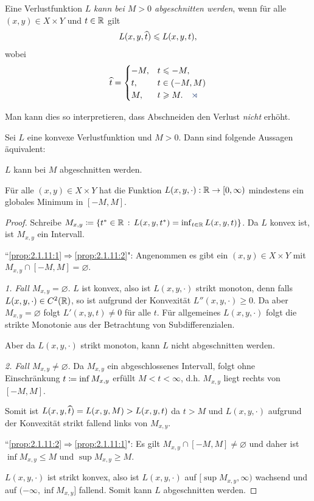 \begin{defn}
\label{defn:2.1.10}
Eine Verlustfunktion $L$ \emph{kann bei $M>0$ abgeschnitten werden},
wenn für alle $(x,y)\in X\times Y$ und $t\in\mathbb{R}$ gilt
\begin{align*}
L(x,y,\cut{t}) \le L(x,y,t),
\end{align*}
wobei 
\begin{align*}
\cut{t} = 
\begin{cases}
-M, & t \le -M,\\
t, & t\in (-M,M)\\
M, & t\ge M.\fishhere
\end{cases}
\end{align*}
\end{defn}
Man kann dies so interpretieren, dass Abschneiden den Verlust \textit{nicht}
erhöht.

\begin{lem}
\label{prop:2.1.11}
Sei $L$ eine konvexe Verlustfunktion und $M>0$. Dann sind folgende Aussagen
äquivalent:
\begin{equivenum}
\item\label{prop:2.1.11:1} $L$ kann bei $M$ abgeschnitten werden.
\item\label{prop:2.1.11:2} Für alle $(x,y)\in X\times Y$ hat die Funktion
$L(x,y,\cdot): \mathbb{R}\to[0,\infty)$ mindestens ein globales Minimum in $[-M,M]$.\fishhere
\end{equivenum}
\end{lem}
\begin{proof}
Schreibe $M_{x,y}\coloneq \left\{ t^*\in \mathbb{R}\,:\,L(x,y,t^*)=\inf_{t\in\mathbb{R}} L(x,y,t)\right\}$. Da
$L$ konvex ist, ist $M_{x,y}$ ein Intervall. 

``\ref{prop:2.1.11:1}$\Rightarrow$\ref{prop:2.1.11:2}": Angenommen es gibt ein
$(x,y)\in X\times Y$ mit $M_{x,y}\cap [-M,M] = \varnothing$.

\textit{1. Fall $M_{x,y}=\varnothing$}. $L$ ist konvex, also ist $L(x,y,\cdot)$
strikt monoton, denn falls $L(x,y,\cdot)\in C^2(\mathbb{R})$, so ist aufgrund der
Konvexität $L''(x,y,\cdot) \ge 0$. Da aber $M_{x,y}=\varnothing$ folgt
$L'(x,y,t)\neq 0$ für alle $t$. Für allgemeines $L(x,y,\cdot)$ folgt die strikte
Monotonie aus der Betrachtung von Subdifferenzialen.

Aber da $L(x,y,\cdot)$ strikt monoton, kann $L$ nicht abgeschnitten
werden.\dipper

\textit{2. Fall $M_{x,y}\neq \varnothing$}. Da $M_{x,y}$ ein abgeschlossenes
Intervall, folgt ohne Einschränkung $t\coloneq\inf M_{x,y}$ erfüllt $M< t<\infty$,
d.h. $M_{x,y}$  liegt rechts von $[-M,M]$.

Somit ist $L(x,y,\cut{t}) = L(x,y,M) > L(x,y,t)$ da $t>M$ und $L(x,y,\cdot)$
aufgrund der Konvexität strikt fallend links von $M_{x,y}$.\dipper

``\ref{prop:2.1.11:2}$\Rightarrow$\ref{prop:2.1.11:1}": Es gilt $M_{x,y}\cap
[-M,M] \neq \varnothing$ und daher ist $\inf M_{x,y} \le M$ und $\sup M_{x,y}\ge
M$.

$L(x,y,\cdot)$ ist strikt konvex, also ist $L(x,y,\cdot)$ auf $[\sup
M_{x,y},\infty)$ wachsend und auf $(-\infty,\inf M_{x,y}]$ fallend.
Somit kann $L$ abgeschnitten werden.\qedhere
\end{proof}

